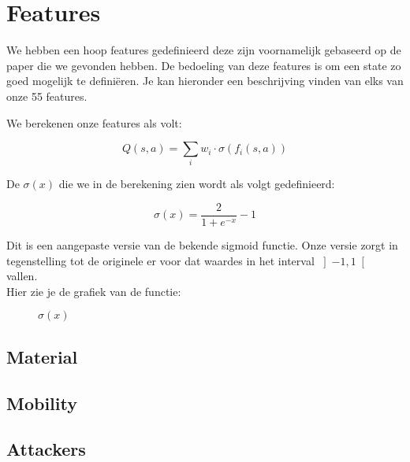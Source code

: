 \documentclass[a4paper,openany]{uantwerpenassignment}
\begin{document}
\section{Features}

We hebben een hoop features gedefinieerd deze zijn voornamelijk gebaseerd op de paper\cite{rl} die we gevonden hebben. De bedoeling van deze features is om een state zo goed mogelijk te definiëren. Je kan hieronder een beschrijving vinden van elks van onze 55 features.

We berekenen onze features als volt:

$$
Q(s,a) = \sum_{i} w_{i} \cdot \sigma \left( f_i(s, a)\right)
$$

De $\sigma(x)$ die we in de berekening zien wordt als volgt gedefinieerd:

$$
\sigma(x) = \frac{2}{1 + e^{-x}} - 1
$$

Dit is een aangepaste versie van de bekende sigmoid\cite{WSF} functie. Onze versie zorgt in tegenstelling tot de originele er voor dat waardes in het interval $\left]-1,1\right[$ vallen.\\
Hier zie je de grafiek van de functie:

\begin{figure}[h]
    \centering
    \caption{$\sigma(x)$} \label{fig:sigmoid}
\end{figure}


\subsection{Material}
\subsection{Mobility}
\subsection{Attackers}
\end{document}
